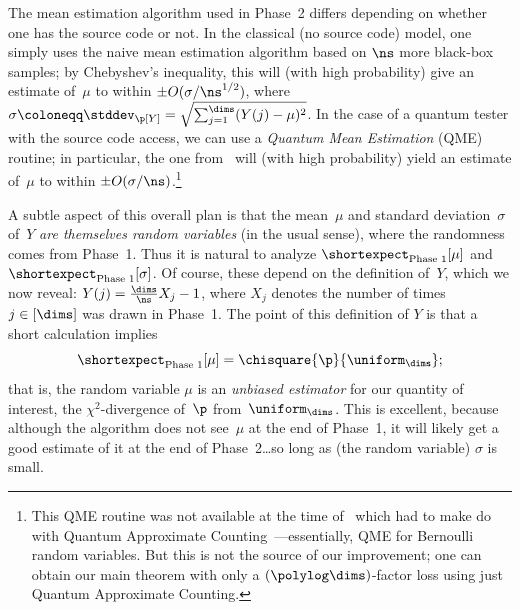 \documentclass[11pt]{article}
\newcommand{\E}{\shortexpect}
\begin{document}
The mean estimation algorithm used in Phase~2 differs depending on whether one has the source code or not.  
In the classical (no source code) model, one simply uses the naive mean estimation algorithm based on $\ns$ more black-box samples; by Chebyshev's inequality, this will (with high probability) give an estimate of~$\mu$ to within $\pm O(\sigma/\ns^{1/2})$, where $\sigma \coloneqq \stddev_\p[Y] = \sqrt{\sum_{j=1}^\dims (Y(j) - \mu)^2}$.
In the case of a quantum tester with the source code access, we can use a \emph{Quantum Mean Estimation} (QME) routine; in particular, the one from~\cite{KO23} will (with high probability) yield an estimate of~$\mu$ to within $\pm O(\sigma/\ns)$.\footnote{This QME routine was not available at the time of~\cite{BHH11,CFMdW10} which had to make do with Quantum Approximate Counting~\cite{BHT98}---essentially, QME for Bernoulli random variables.  But this is not the source of our improvement; one can obtain our main theorem with only a $(\polylog \dims)$-factor loss using just Quantum Approximate Counting.} 

A subtle aspect of this overall plan is that the mean~$\mu$ and standard deviation~$\sigma$ of~$Y$ \emph{are themselves random variables} (in the usual sense), where the randomness comes from Phase~1.  
Thus it is natural to analyze $\E_{\text{Phase~1}}[\mu]$ and $\E_{\text{Phase~1}}[\sigma]$.
Of course, these depend on the definition of~$Y$, which we now reveal:  $Y(j) = \frac{\dims}{\ns}X_j - 1$, where $X_j$ denotes the number of times $j \in [\dims]$ was drawn in Phase~1.
The point of this definition of $Y$ is that a short calculation implies 
\begin{equation}
  \E_{\text{Phase~1}}[\mu] = \chisquare{\p}{\uniform_\dims};
\end{equation}
that is, the random variable $\mu$ is an \emph{unbiased estimator} for our quantity of interest, the $\chi^2$-divergence of~$\p$ from~$\uniform_\dims$.
This is excellent, because although the algorithm does not see~$\mu$ at the end of Phase~1, it will likely get a good estimate of it at the end of Phase~2\dots so long as (the random variable) $\sigma$ is small. 
\end{document}

